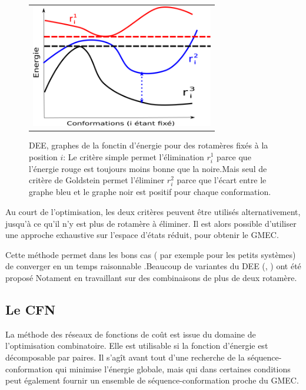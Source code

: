    \begin{figure}[!htbp]
     \centering
     \begin{tabular}{c}
       \includegraphics[width=8cm]{figure/DEE.png} &
     \end{tabular}
     
     \caption{DEE, graphes de la fonctin d'énergie pour des rotamères fixés à la position $i$: Le critère simple permet l'élimination $r^1_i$ parce que l'énergie rouge est toujours moins bonne que la noire.Mais seul de critère de Goldstein permet l'éliminer $r^2_i$ parce que l'écart entre le graphe bleu et le graphe noir est positif pour chaque conformation.}
\label{fig:DDE}
   \end{figure}




Au court de l'optimisation, les deux critères peuvent être utilisés alternativement, jusqu'à ce qu'il n'y est plus de rotamère à éliminer. Il est alors possible d'utiliser une approche exhaustive sur l'espace d'états réduit, pour obtenir le GMEC.

Cette méthode permet dans les bons cas ( par exemple pour les petits systèmes) de converger en un temps raisonnable \cite{Leach98}.Beaucoup de variantes du DEE (\cite{Pierce00}, \cite{Lilien05}) ont été proposé Notament en travaillant sur des combinaisons de plus de deux rotamère.


\subsection{Le CFN}

La méthode des réseaux de fonctions de coût est issue du domaine de l'optimisation combinatoire. Elle est utilisable si la fonction d'énergie est décomposable par paires.
Il s'agît avant tout d'une recherche de la séquence-conformation qui minimise l'énergie globale, mais qui dans certaines conditions peut également fournir un ensemble de séquence-conformation proche du GMEC.

